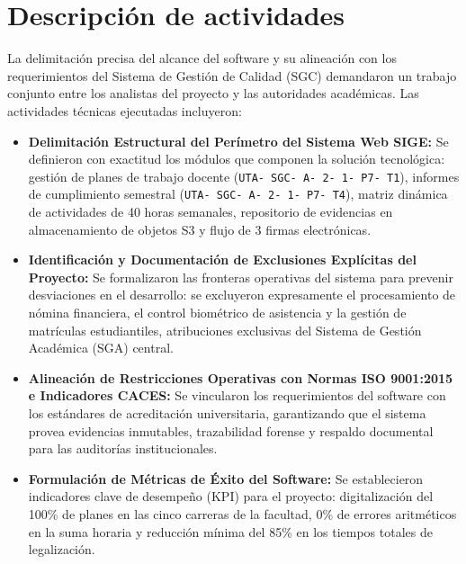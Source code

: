 \documentclass[12pt,a4paper]{article}
\begin{document}
\section{Descripción de actividades}
La delimitación precisa del alcance del software y su alineación con los requerimientos del Sistema de Gestión de Calidad (SGC) demandaron un trabajo conjunto entre los analistas del proyecto y las autoridades académicas. Las actividades técnicas ejecutadas incluyeron:

\begin{itemize}[leftmargin=1.5em, itemsep=4pt]
    \item \textbf{Delimitación Estructural del Perímetro del Sistema Web SIGE:} Se definieron con exactitud los módulos que componen la solución tecnológica: gestión de planes de trabajo docente (\texttt{UTA- SGC- A- 2- 1- P7- T1}), informes de cumplimiento semestral (\texttt{UTA- SGC- A- 2- 1- P7- T4}), matriz dinámica de actividades de 40 horas semanales, repositorio de evidencias en almacenamiento de objetos S3 y flujo de 3 firmas electrónicas.
    \item \textbf{Identificación y Documentación de Exclusiones Explícitas del Proyecto:} Se formalizaron las fronteras operativas del sistema para prevenir desviaciones en el desarrollo: se excluyeron expresamente el procesamiento de nómina financiera, el control biométrico de asistencia y la gestión de matrículas estudiantiles, atribuciones exclusivas del Sistema de Gestión Académica (SGA) central.
    \item \textbf{Alineación de Restricciones Operativas con Normas ISO 9001:2015 e Indicadores CACES:} Se vincularon los requerimientos del software con los estándares de acreditación universitaria, garantizando que el sistema provea evidencias inmutables, trazabilidad forense y respaldo documental para las auditorías institucionales.
    \item \textbf{Formulación de Métricas de Éxito del Software:} Se establecieron indicadores clave de desempeño (KPI) para el proyecto: digitalización del 100\% de planes en las cinco carreras de la facultad, 0\% de errores aritméticos en la suma horaria y reducción mínima del 85\% en los tiempos totales de legalización.
\end{itemize}
\end{document}
